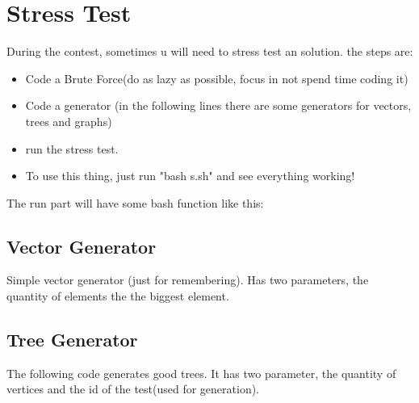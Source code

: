     \section{Stress Test}
    \tab During the contest, sometimes u will need to stress test an solution.
    the steps are:
    \begin{itemize}
        \item Code a Brute Force(do as lazy as possible, focus in not spend time coding it)
        \item Code a generator (in the following lines there are some generators for vectors, trees and graphs)
        \item run the stress test.
        \item To use this thing, just run "bash s.sh" and see everything working!
    \end{itemize}

    The run part will have some bash function like this:
    
    

    \subsection{Vector Generator}

    \tab Simple vector generator (just for remembering). Has two parameters, the quantity of elements the the biggest element.
    
    
    
    \subsection{Tree Generator}
    \tab The following code generates good trees. It has two parameter, the quantity of vertices and the id of the test(used for generation).

    

    
